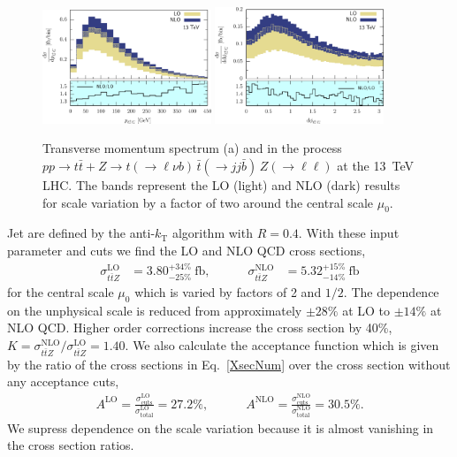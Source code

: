 \documentclass[preprint]{JHEP3} %
\def\ttb{t\bar{t}}
\newcommand{\be}{\begin{eqnarray}}
\newcommand{\ee}{\end{eqnarray}}
\begin{document}
\begin{figure}[t]
\centering %
\includegraphics[width=0.45\textwidth]{./LHC_53_Fig12.eps}
\hfill
\includegraphics[width=0.45\textwidth]{./LHC_53_Fig17.eps}
\caption{\label{fig:i} Transverse momentum spectrum (a) and 
in the process $pp \to \ttb + Z \to t(\to \ell \nu b) \, \bar{t} (\to jj \bar{b}) \, Z(\to \ell \ell)$ at the 13~TeV LHC.
The bands represent the LO (light) and NLO (dark) results for scale variation by a factor of two around the central scale $\mu_0$.
}
\end{figure}
Jet are defined by the anti-$k_\mathrm{T}$ algorithm \cite{Cacciari:2008gp} with $R=0.4$.
With these input parameter and cuts we find the LO and NLO QCD cross sections,
\be
\label{XsecNum}
  \sigma_{\ttb Z}^\mathrm{LO} &= 3.80^{+34\%}_{-25\%}~\mathrm{fb},
  \quad\quad\quad
  \sigma_{\ttb Z}^\mathrm{NLO} &= 5.32^{+15\%}_{-14\%}~\mathrm{fb}
\ee
for the central scale $\mu_0$ which is varied by factors of 2 and $1/2$.
The dependence on the unphysical scale is reduced from approximately $\pm 28\%$ at LO to $\pm 14\%$ at NLO QCD.
Higher order corrections increase the cross section by 40\%, $K= \sigma_{\ttb Z}^\mathrm{NLO} \big/  \sigma_{\ttb Z}^\mathrm{LO}=1.40$.
We also calculate the acceptance function which is given by the ratio of the cross sections in Eq.~\ref{XsecNum} over the 
cross section without any acceptance cuts, 
\be
  A^\mathrm{LO} = \frac{\sigma_{\mathrm{cuts}}^\mathrm{LO}}{\sigma_{\mathrm{total}}^\mathrm{LO}} = 27.2 \% ,
  \quad\quad\quad
  A^\mathrm{NLO} = \frac{\sigma_{\mathrm{cuts}}^\mathrm{NLO}}{\sigma_{\mathrm{total}}^\mathrm{NLO}} = 30.5 \%.
\ee
We supress dependence on the scale variation because it is almost vanishing in the cross section ratios.
\end{document}
